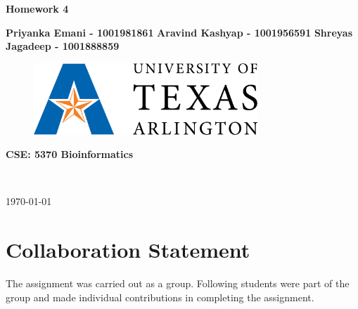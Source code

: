 \documentclass{article}
\begin{document}
\begin{titlepage}
    \begin{center}
        \vspace*{3cm}
            
        \Huge
        \textbf{Homework 4}
            
        \vspace{1cm}
        \huge
        
            
        \vspace{1.5cm}
      \huge
            
        \centering
        \textbf{Priyanka Emani - 1001981861} 
        \centering
        \newline
        \textbf{Aravind Kashyap - 1001956591}
        \centering
        \newline
        \textbf{Shreyas Jagadeep - 1001888859}
        
            
       
        \vspace{1cm}
            \begin{figure}[h!]
                \centering
                \includegraphics[width=0.75\textwidth]{1280px-University_of_Texas_at_Arlington_logo.svg.png}
                        \label{fig:my_label}
            \end{figure}
       
        \vspace{2cm}
        \huge
       \textbf{CSE: 5370 Bioinformatics} 
            
        \\
      
  \huge
        \vspace{2cm}
       \huge
        
        \today
            
    \end{center}
\end{titlepage}
\newpage

\section*{Collaboration Statement}
The assignment was carried out as a group. Following students were part of the group and made
individual contributions in completing the assignment.
\end{document}
